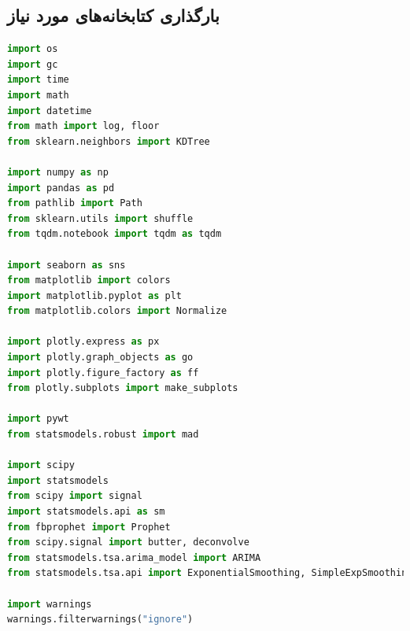 \documentclass{article}
\begin{document}
\subsection{بارگذاری کتابخانه‌های مورد نیاز}
\begin{latin}
\begin{lstlisting}[language=Python]
import os
import gc
import time
import math
import datetime
from math import log, floor
from sklearn.neighbors import KDTree

import numpy as np
import pandas as pd
from pathlib import Path
from sklearn.utils import shuffle
from tqdm.notebook import tqdm as tqdm

import seaborn as sns
from matplotlib import colors
import matplotlib.pyplot as plt
from matplotlib.colors import Normalize

import plotly.express as px
import plotly.graph_objects as go
import plotly.figure_factory as ff
from plotly.subplots import make_subplots

import pywt
from statsmodels.robust import mad

import scipy
import statsmodels
from scipy import signal
import statsmodels.api as sm
from fbprophet import Prophet
from scipy.signal import butter, deconvolve
from statsmodels.tsa.arima_model import ARIMA
from statsmodels.tsa.api import ExponentialSmoothing, SimpleExpSmoothing, Holt

import warnings
warnings.filterwarnings("ignore") 
\end{lstlisting}
\end{latin}
\end{document}
